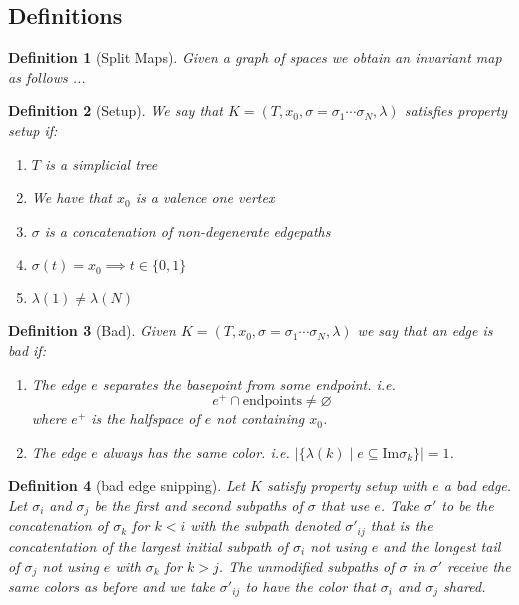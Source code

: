 \documentclass{article}
\theoremstyle{mystyle}
\newtheorem{defn}{Definition}
\theoremstyle{remark}
\begin{document}
\subsection{Definitions}

\begin{defn}
    [Split Maps]
    \label{def:splitmaps} 
    Given a graph of spaces we obtain an invariant map as follows ...
\end{defn}

\begin{defn}
    [Setup]
    \label{def:setup} 
    We say that \(K = (T, x_{0},\sigma=\sigma_{1}\cdots\sigma_{N},\lambda)\) satisfies property {\em setup} if:
    \begin{enumerate}
        \item \(T\) is a simplicial tree
        \item We have that \(x_{0}\) is a valence one vertex
        \item \(\sigma\) is a concatenation of non-degenerate edgepaths
        \item \(\sigma (t)=x_{0} \implies t \in \{0,1\}\) 
        \item \(\lambda (1) \neq \lambda (N)\) 
    \end{enumerate}
\end{defn}


\begin{defn}
    [Bad]
    Given \(K = (T, x_{0},\sigma=\sigma_{1}\cdots\sigma_{N},\lambda)\) we say that an edge is {\em bad} if:
    \begin{enumerate}
        \item The edge \(e\) separates the basepoint from some endpoint. i.e. \[e^{+} \cap \text{endpoints} \neq \varnothing\] where \(e^{+}\) is the halfspace of \(e\) not containing \(x_{0}\).
        \item The edge \(e\) always has the same color. i.e. \(\left| \{\lambda (k) \mid e \subseteq \text{Im} \sigma_{k}\} \right|=1\).
    \end{enumerate}
\end{defn}

\begin{defn}
	[bad edge snipping]
    Let \(K\) satisfy property setup with \(e\) a bad edge. Let \(\sigma_{i}\) and \(\sigma_{j}\) be the first and second subpaths of \(\sigma\) that use \(e\). Take \(\sigma '\) to be the concatenation of \(\sigma_{k}\) for \(k < i\) with the subpath denoted \(\sigma '_{ij}\) that is the concatentation of the largest initial subpath of \(\sigma_{i}\) not using \(e\) and the longest tail of \(\sigma_j\) not using \(e\) with \(\sigma_{k}\) for \(k > j\). The unmodified subpaths of \(\sigma\) in \(\sigma '\) receive the same colors as before and we take \(\sigma '_{ij}\) to have the color that \(\sigma_{i}\) and \(\sigma_{j}\) shared.
\end{defn}
\end{document}
